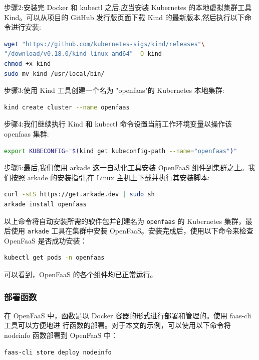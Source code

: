 \documentclass[a4paper,AutoFakeBold,oneside,12pt]{book}
\begin{document}
步骤2:安装完 Docker 和 kubectl 之后,应当安装 Kubernetes 的本地虚拟集群工具 Kind。可以从项目的 GitHub 发行版页面下载 Kind 的最新版本,然后执行以下命令进行安装:
\begin{lstlisting}[language=bash]
wget "https://github.com/kubernetes-sigs/kind/releases"\
"/download/v0.18.0/kind-linux-amd64" -O kind 
chmod +x kind
sudo mv kind /usr/local/bin/
\end{lstlisting}

步骤3:使用 Kind 工具创建一个名为 "openfaas"的 Kubernetes 本地集群:
\begin{lstlisting}[language=bash]
kind create cluster --name openfaas 
\end{lstlisting}

步骤4:我们继续执行 Kind 和 kubectl 命令设置当前工作环境变量以操作该 openfaas 集群:
\begin{lstlisting}[language=bash] 
export KUBECONFIG="$(kind get kubeconfig-path --name="openfaas")"
\end{lstlisting}

步骤5:最后,我们使用 arkade 这一自动化工具安装 OpenFaaS 组件到集群之上。我们按照 arkade 的安装指引,在 Linux 主机上下载并执行其安装脚本: 
\begin{lstlisting}[language=bash]
curl -sLS https://get.arkade.dev | sudo sh
arkade install openfaas
\end{lstlisting}

以上命令将自动安装所需的软件包并创建名为 \verb|openfaas| 的 Kubernetes 集群，最后使用 \verb|arkade| 工具在集群中安装 OpenFaaS。安装完成后，使用以下命令来检查 OpenFaaS 是否成功安装：

\begin{lstlisting}[language=bash]
kubectl get pods -n openfaas
\end{lstlisting}

可以看到，OpenFaaS 的各个组件均已正常运行。


\subsubsection{部署函数}

在 OpenFaaS 中，函数是以 Docker 容器的形式进行部署和管理的。使用 faas-cli 工具可以方便地进
行函数的部署。对于本文的示例，可以使用以下命令将 nodeinfo 函数部署到 OpenFaaS 中：

\begin{lstlisting}[language=bash]
faas-cli store deploy nodeinfo
\end{lstlisting}
\end{document}
